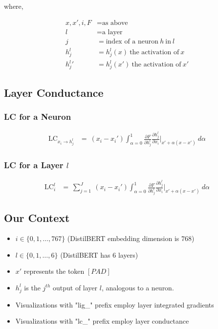 \documentclass{article}
\begin{document}
	
	\noindent where,
	
	\begin{align*}
		x, x', i, F &= \text{as above} \\
		l &= \text{a layer} \\
		j &= \text{index of a neuron} \ h \ \text{in} \ l \\		
		h_{j}^{l} &= h_{j}^{l}(x) \ \text{the activation of} \ x \\
		{h_{j}^{l}}' &= h_{j}^{l}(x') \ \text{the activation of} \ x'
	\end{align*}
	
	\subsection{Layer Conductance}
	
	\subsubsection{LC for a Neuron}
	
	\begin{align*}
		\text{LC}_{x_i \rightarrow {h_{j}^{l}}} &= \ (x_i - x_i') \int_{\alpha=0}^{1} \frac{\partial F}{\partial {h_{j}^{l}}} \frac{\partial {h_{j}^{l}}}{\partial x_i} \Big|_{x' + \alpha (x - x')} \ d\alpha
	\end{align*}

	\subsubsection{LC for a Layer $l$}

	\begin{align*}
		\text{LC}_{i}^{l} &= \ \sum_{j=1}^{J} \ (x_i - x_i') \int_{\alpha=0}^{1} \frac{\partial F}{\partial {h_{j}^{l}}} \frac{\partial {h_{j}^{l}}}{\partial x_i} \Big|_{x' + \alpha (x - x')} \ d\alpha
	\end{align*}

	\subsection{Our Context}
	
	\begin{itemize}
		\item $i \in \lbrace 0, 1, \ldots, 767 \rbrace$ (DistilBERT embedding dimension is $768$)
		\item $l \in \lbrace 0, 1, \ldots, 6 \rbrace$ (DistilBERT has $6$ layers)
		\item $x'$ represents the token $[PAD]$
		\item ${h_{j}^{l}}$ is the $j^{th}$ output of layer $l$, analogous to a neuron.
		\item Visualizations with "lig\_" prefix employ layer integrated gradients
		\item Visualizations with "lc\_" prefix employ layer conductance
	\end{itemize}
	
\end{document}
